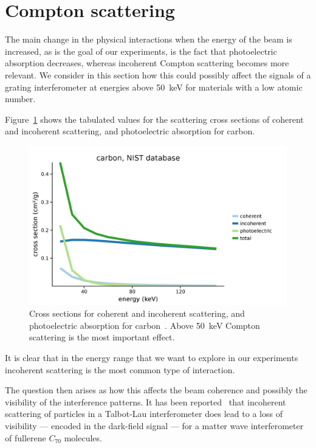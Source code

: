 \section{Compton scattering}
The main change in the physical interactions when the energy of the beam is
increased, as is the goal of our experiments, is the fact that photoelectric
absorption decreases, whereas incoherent Compton scattering becomes more
relevant. We consider in this section how this could possibly affect the
signals of a grating interferometer at energies above \SI{50}{\kilo\eV} for
materials with a low atomic number.

Figure~\ref{fig:carbon-cross-sections} shows the tabulated values for the
scattering cross sections of coherent and incoherent scattering, and
photoelectric absorption for carbon.

\begin{figure}[htb]
    \centering
    \includegraphics[width=\textwidth]{gfx/compton/carbon_cross_section.png}
    \caption[Scattering cross sections.]{Cross sections for coherent and incoherent scattering, and
        photoelectric absorption for carbon~\parencite{nist}. Above \SI{50}{\kilo\eV} Compton
    scattering is the most important effect.}
    \label{fig:carbon-cross-sections}
\end{figure}

It is clear that in the energy range that we want to explore in our
experiments incoherent scattering is the most common type of interaction.

The question then arises as how this affects the beam coherence and possibly
the visibility of the interference patterns. It has been
reported~\parencite{PhysRevLett.90.160401} that incoherent scattering of
particles in a Talbot-Lau interferometer does lead to a loss of visibility
--- encoded in the dark-field signal --- for a matter wave interferometer of
fullerene $C_{70}$ molecules.

